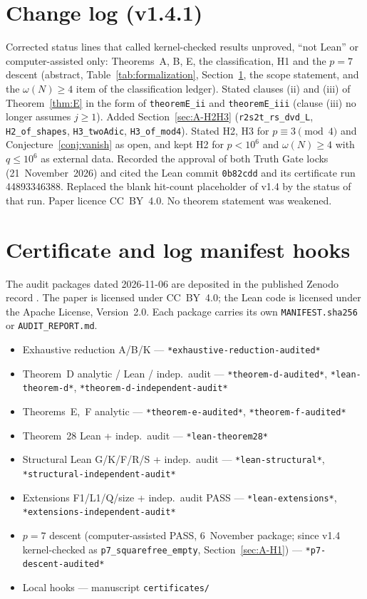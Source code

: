 \documentclass[11pt,reqno]{amsart}
\theoremstyle{definition}
\begin{document}
\section*{Change log (v1.4.1)}
Corrected status lines that called kernel-checked results unproved, ``not Lean'' or computer-assisted only: Theorems~A, B, E, the classification, H1 and the \(p=7\) descent (abstract, Table~\ref{tab:formalization}, Section~\ref{sec:manifest}, the scope statement, and the \(\omega(N)\ge 4\) item of the classification ledger). Stated clauses (ii) and (iii) of Theorem~\ref{thm:E} in the form of \texttt{theoremE\_ii} and \texttt{theoremE\_iii} (clause (iii) no longer assumes \(j\ge 1\)). Added Section~\ref{sec:A-H2H3} (\texttt{r2s2t\_rs\_dvd\_L}, \texttt{H2\_of\_shapes}, \texttt{H3\_twoAdic}, \texttt{H3\_of\_mod4}). Stated H2, H3 for \(p\equiv 3\pmod 4\) and Conjecture~\ref{conj:vanish} as open, and kept H2 for \(p<10^6\) and \(\omega(N)\ge 4\) with \(q\le 10^6\) as external data. Recorded the approval of both Truth Gate locks (21~November~2026) and cited the Lean commit \texttt{0b82cdd} and its certificate run 44893346388. Replaced the blank hit-count placeholder of v1.4 by the status of that run. Paper licence CC~BY~4.0. No theorem statement was weakened.

\fussy
\section{Certificate and log manifest hooks}
\label{sec:manifest}

The audit packages dated 2026-11-06 are deposited in the published Zenodo record . The paper is licensed under CC~BY~4.0; the Lean code is licensed under the Apache License, Version~2.0. Each package carries its own \texttt{MANIFEST.sha256} or \texttt{AUDIT\_REPORT.md}.

{\raggedright
\begin{itemize}\setlength{\itemsep}{2pt}
\item Exhaustive reduction A/B/K --- \texttt{*exhaustive-reduction-audited*}
\item Theorem~D analytic / Lean / indep.\ audit --- \texttt{*theorem-d-audited*}, \texttt{*lean-theorem-d*}, \texttt{*theorem-d-independent-audit*}
\item Theorems~E,~F analytic --- \texttt{*theorem-e-audited*}, \texttt{*theorem-f-audited*}
\item Theorem~28 Lean + indep.\ audit --- \texttt{*lean-theorem28*}
\item Structural Lean G/K/F/R/S + indep.\ audit --- \texttt{*lean-structural*}, \texttt{*structural-independent-audit*}
\item Extensions F1/L1/Q/size + indep.\ audit PASS --- \texttt{*lean-extensions*}, \texttt{*extensions-independent-audit*}
\item \(p=7\) descent (computer-assisted PASS, 6~November package; since v1.4 kernel-checked as \texttt{p7\_squarefree\_empty}, Section~\ref{sec:A-H1}) --- \texttt{*p7-descent-audited*}
\item Local hooks --- manuscript \texttt{certificates/}
\end{itemize}
}
\end{document}
